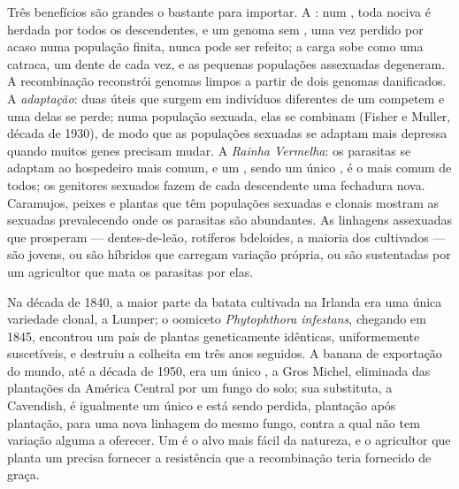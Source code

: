 \begin{proposition}\label{prop:b2:asexual-reproduction:whysex}
Três benefícios são grandes o bastante para importar. A \emph{}: num , toda  nociva é herdada por todos os
descendentes, e um genoma sem , uma vez perdido por acaso numa
população finita, nunca pode ser refeito; a carga sobe como uma
catraca, um dente de cada vez, e as pequenas populações assexuadas
degeneram. A recombinação reconstrói genomas limpos a partir de dois
genomas danificados. A \emph{adaptação}: duas  úteis que surgem
em indivíduos diferentes de um  competem e uma delas se perde;
numa população sexuada, elas se combinam (Fisher e Muller, década de
1930), de modo que as populações sexuadas se adaptam mais depressa
quando muitos genes precisam mudar. A \emph{Rainha Vermelha}: os
parasitas se adaptam ao  hospedeiro mais comum, e um ,
sendo um único , é o mais comum de todos; os genitores
sexuados fazem de cada descendente uma fechadura nova. Caramujos,
peixes e plantas que têm populações sexuadas e clonais mostram as
sexuadas prevalecendo onde os parasitas são abundantes. As linhagens
assexuadas que prosperam --- dentes-de-leão, rotíferos bdeloides, a
maioria dos  cultivados --- são jovens, ou são híbridos
 que carregam variação própria, ou são sustentadas por um
agricultor que mata os parasitas por elas.
\end{proposition}

\begin{example}\label{ex:b2:asexual-reproduction:monoculture}
Na década de 1840, a maior parte da batata cultivada na Irlanda era uma
única variedade clonal, a Lumper; o oomiceto \emph{Phytophthora
infestans}, chegando em 1845, encontrou um país de plantas
geneticamente idênticas, uniformemente suscetíveis, e destruiu a
colheita em três anos seguidos. A banana de exportação do mundo, até a
década de 1950, era um único , a Gros Michel, eliminada das
plantações da América Central por um fungo do solo; sua substituta, a
Cavendish, é igualmente um único  e está sendo perdida, plantação
após plantação, para uma nova linhagem do mesmo fungo, contra a qual
não tem variação alguma a oferecer. Um  é o alvo mais fácil da
natureza, e o agricultor que planta um precisa fornecer a resistência
que a recombinação teria fornecido de graça.
\end{example}

